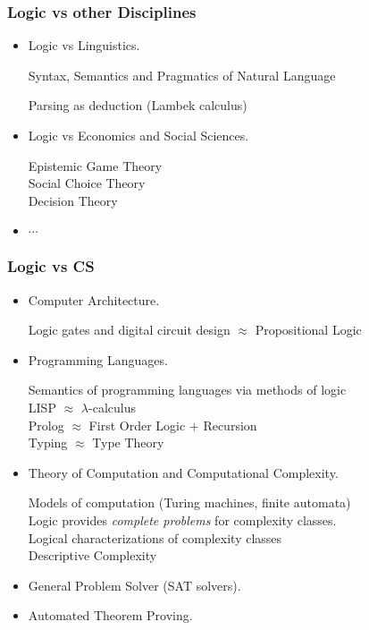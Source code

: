 \documentclass[UTF8,11pt,colorlinks,compress,openany]{beamer}%
\begin{document}
\begin{frame}\frametitle{Logic vs other Disciplines}
	\begin{itemize}
		\item Logic vs Linguistics.

		Syntax, Semantics and Pragmatics of Natural Language

		Parsing as deduction (Lambek calculus)
		\item Logic vs Economics and Social Sciences.

		Epistemic Game Theory\\
		Social Choice Theory\\
		Decision Theory
		\item $\cdots$
	\end{itemize}
\end{frame}

\begin{frame}\frametitle{Logic vs CS}
	\begin{itemize}
		\item Computer Architecture.
		
		Logic gates and digital circuit design $\approx$ Propositional Logic
		\item Programming Languages.
		
		Semantics of programming languages via methods of logic\\
		LISP $\approx$ $\lambda$-calculus\\
		Prolog $\approx$ First Order Logic $+$ Recursion\\
		Typing $\approx$ Type Theory
		\item Theory of Computation and Computational Complexity.
		
		Models of computation (Turing machines, finite automata)\\
		Logic provides \emph{complete problems} for complexity classes.\\
		Logical characterizations of complexity classes\\
		Descriptive Complexity
		\item General Problem Solver (SAT solvers).
		\item Automated Theorem Proving.
	\end{itemize}
\end{frame}
\end{document}
